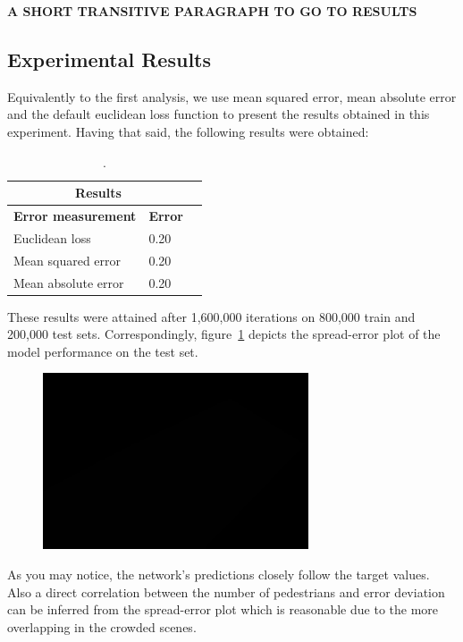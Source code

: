 \textbf{A SHORT TRANSITIVE PARAGRAPH TO GO TO RESULTS}

\subsection{Experimental Results}

Equivalently to the first analysis, we use mean squared error, mean absolute error and the default euclidean loss function to present the results obtained in this experiment. Having that said, the following results were obtained:

\begin{table}[H]
\centering
\small\sffamily
\begin{tabular}{llr}
\multicolumn{2}{c}{\textbf{\textbf{Results}}} \\
\bottomrule
\textbf{Error measurement}        & \textbf{Error} \\
\bottomrule
Euclidean loss           & 0.20  \\
Mean squared error       & 0.20  \\
Mean absolute error      & 0.20  \\
\bottomrule
\end{tabular}
\caption{.}
\label{tab:res}
\end{table} 

These results were attained after 1,600,000 iterations on 800,000 train and 200,000 test sets. Correspondingly, figure~\ref{fig:splot} depicts the spread-error plot of the model performance on the test set.

\begin{figure}[H]
	\centering
	{\includegraphics[width=0.7\textwidth]{images/1}}
	\caption{}
	\label{fig:splot}
\end{figure}

As you may notice, the network's predictions closely follow the target values. Also a direct correlation between the number of pedestrians and error deviation can be inferred from the spread-error plot which is reasonable due to the more overlapping in the crowded scenes. 

